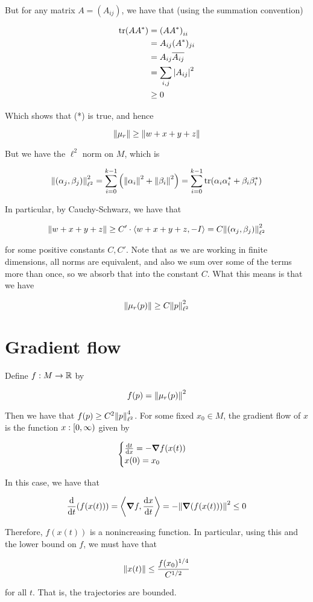 \documentclass{article}
\begin{document}
But for any matrix \(A = (A_{ij})\), we have that (using the summation convention)

\begin{align*}
    \tr(AA^*) &= \left(AA^*\right)_{ii} \\
    &= A_{ij}(A^*)_{ji} \\
    &= A_{ij}\overline{A_{ij}} \\
    &= \sum_{i, j}\abs{A_{ij}}^2 \\
    &\ge 0
\end{align*}

Which shows that (*) is true, and hence

\[\norm{\mu_r} \ge \norm{w+x+y+z}\]

But we have the \(\ell^2\) norm on \(M\), which is

\[\norm{(\alpha_j, \beta_j)}^2_{\ell^2} = \sum_{i=0}^{k-1}\left(\norm{\alpha_i}^2 + \norm{\beta_i}^2\right) = \sum_{i=0}^{k-1}\tr(\alpha_i\alpha_i^* + \beta_i\beta_i^*)\]

In particular, by Cauchy-Schwarz, we have that

\[\norm{w + x + y + z} \ge C' \cdot \left\langle w+x+y+z, -I \right\rangle = C \norm{(\alpha_j, \beta_j)}_{\ell^2}^2\]

for some positive constants \(C, C'\). Note that as we are working in finite dimensions, all norms are equivalent, and also we sum over some of the terms more than once, so we absorb that into the constant \(C\). What this means is that we have

\[\norm{\mu_r(p)} \ge C\norm{p}^2_{\ell^2}\]

\section{Gradient flow}

Define \(f : M \to \mathbb{R}\) by

\[f(p) = \norm{\mu_r(p)}^2\]

Then we have that \(f(p) \ge C^2\norm{p}_{\ell^2}^4\). For some fixed \(x_0 \in M\), the gradient flow of \(x\) is the function \(x : [0, \infty)\) given by

\[\begin{cases}
    \dv{t}{x} = -\grad f(x(t)) \\
    x(0) = x_0
\end{cases}\]

In this case, we have that

\[\dv{t}(f(x(t))) = \left\langle \grad f, \dv{x}{t} \right\rangle = -\norm{\grad(f(x(t)))}^2 \le 0\]

Therefore, \(f(x(t))\) is a nonincreasing function. In particular, using this and the lower bound on \(f\), we must have that

\[\norm{x(t)} \le \frac{f(x_0)^{1/4}}{C^{1/2}}\]

for all \(t\). That is, the trajectories are bounded.

\printbibliography
\end{document}
